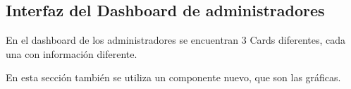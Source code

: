 \subsection{Interfaz del Dashboard de administradores}
En el dashboard de los administradores se encuentran 3 Cards diferentes, cada una con información diferente.

En esta sección también se utiliza un componente nuevo, que son las gráficas.
    